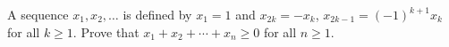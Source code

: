 A sequence $x_1, x_2, \ldots$ is defined by $x_1 = 1$ and $x_{2k} = -x_k$, $x_{2k-1} = (-1)^{k+1} x_k$ for all $k \geq 1$. Prove that $x_1 + x_2 + \cdots + x_n \geq 0$ for all $n \geq 1$.
